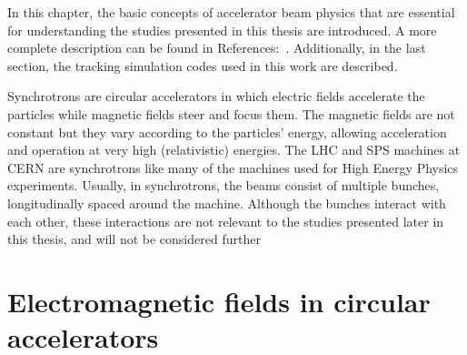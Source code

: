 \thispagestyle{simple} %
In this chapter, the basic concepts of accelerator beam physics that are essential for understanding the studies presented in this thesis are introduced. A more complete description can be found in References:~\cite{wolski2014, Wiedemann:1083415, Lee:1425444}. Additionally, in the last section, the tracking simulation codes used in this work are described.

Synchrotrons are circular accelerators in which electric fields accelerate the particles while magnetic fields steer and focus them. The magnetic fields are not constant but they vary according to the particles' energy, allowing acceleration and operation at very high (relativistic) energies. The LHC and SPS machines at CERN are synchrotrons like many of the machines used for High Energy Physics experiments. Usually, in synchrotrons, the beams consist of multiple bunches, longitudinally spaced around the machine.  Although the bunches interact with each other, these interactions are not relevant to the studies presented later in this thesis, and will not be considered further




\section{Electromagnetic fields in circular accelerators}\label{sec:EM_fields_intro}



